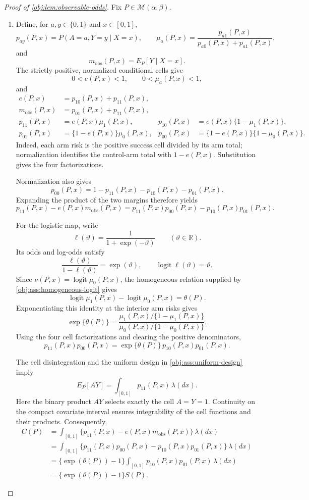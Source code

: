 \documentclass[11pt]{article}
\begin{document}
\begin{proof}[Proof of \cref{obj:lem:observable-odds}]
Fix \(P\in\mathcal M(\alpha,\beta)\).

\begin{enumerate}
\item Define, for \(a,y\in\{0,1\}\) and \(x\in[0,1]\),
\[
p_{ay}(P,x)=P(A=a,Y=y\mid X=x),\qquad
\mu_a(P,x)=\frac{p_{a1}(P,x)}{p_{a0}(P,x)+p_{a1}(P,x)},
\]
and
\[
m_{\mathrm{obs}}(P,x)=E_P[Y\mid X=x].
\]
The strictly positive, normalized conditional cells give
\[
0<e(P,x)<1,\qquad 0<\mu_a(P,x)<1,
\]
and
\[
\begin{aligned}
e(P,x)&=p_{10}(P,x)+p_{11}(P,x),\\
m_{\mathrm{obs}}(P,x)&=p_{01}(P,x)+p_{11}(P,x),\\
p_{11}(P,x)&=e(P,x)\mu_1(P,x),&
p_{10}(P,x)&=e(P,x)\{1-\mu_1(P,x)\},\\
p_{01}(P,x)&=\{1-e(P,x)\}\mu_0(P,x),&
p_{00}(P,x)&=\{1-e(P,x)\}\{1-\mu_0(P,x)\}.
\end{aligned}
\]
Indeed, each arm risk is the positive success cell divided by its arm total; normalization identifies the control-arm total with \(1-e(P,x)\). Substitution gives the four factorizations.

Normalization also gives
\[
p_{00}(P,x)=1-p_{11}(P,x)-p_{10}(P,x)-p_{01}(P,x).
\]
Expanding the product of the two margins therefore yields
\[
p_{11}(P,x)-e(P,x)m_{\mathrm{obs}}(P,x)
=p_{11}(P,x)p_{00}(P,x)-p_{10}(P,x)p_{01}(P,x).
\]

For the logistic map, write
\[
\ell(\vartheta)=\frac{1}{1+\exp(-\vartheta)}
\qquad(\vartheta\in\mathbb R).
\]
Its odds and log-odds satisfy
\[
\frac{\ell(\vartheta)}{1-\ell(\vartheta)}=\exp(\vartheta),
\qquad
\operatorname{logit}\ell(\vartheta)=\vartheta.
\]
Since \(\nu(P,x)=\operatorname{logit}\mu_0(P,x)\), the homogeneous relation supplied by \cref{obj:ass:homogeneous-logit} gives
\[
\operatorname{logit}\mu_1(P,x)
-\operatorname{logit}\mu_0(P,x)=\theta(P).
\]
Exponentiating this identity at the interior arm risks gives
\[
\exp\{\theta(P)\}
=
\frac{\mu_1(P,x)/\{1-\mu_1(P,x)\}}
     {\mu_0(P,x)/\{1-\mu_0(P,x)\}}.
\]
Using the four cell factorizations and clearing the positive denominators,
\[
p_{11}(P,x)p_{00}(P,x)
=\exp\{\theta(P)\}\,p_{10}(P,x)p_{01}(P,x).
\]

The cell disintegration and the uniform design in \cref{obj:ass:uniform-design} imply
\[
E_P[AY]=\int_{[0,1]}p_{11}(P,x)\,\lambda(dx).
\]
Here the binary product \(AY\) selects exactly the cell \(A=Y=1\). Continuity on the compact covariate interval ensures integrability of the cell functions and their products. Consequently,
\[
\begin{aligned}
C(P)
&=\int_{[0,1]}
 \{p_{11}(P,x)-e(P,x)m_{\mathrm{obs}}(P,x)\}\,\lambda(dx)\\
&=\int_{[0,1]}
 \{p_{11}(P,x)p_{00}(P,x)-p_{10}(P,x)p_{01}(P,x)\}\,\lambda(dx)\\
&=\{\exp(\theta(P))-1\}
  \int_{[0,1]}p_{10}(P,x)p_{01}(P,x)\,\lambda(dx)\\
&=\{\exp(\theta(P))-1\}S(P).
\end{aligned}
\]


\end{enumerate}
\end{proof}
\end{document}
